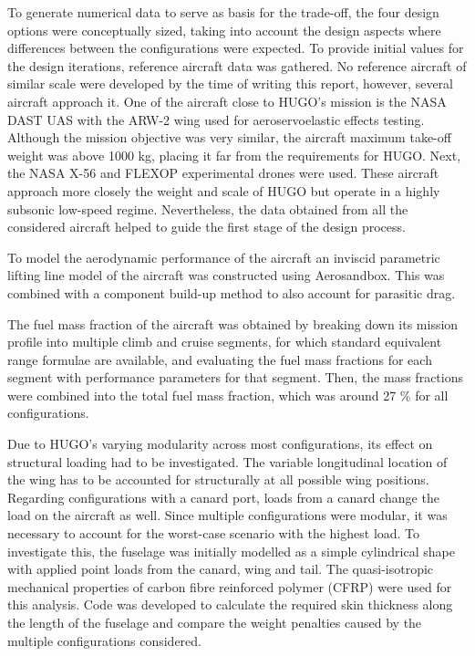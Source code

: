 To generate numerical data to serve as basis for the trade-off, the four design options were conceptually sized, taking into account the design aspects where differences between the configurations were expected. To provide initial values for the design iterations, reference aircraft data was gathered. No reference aircraft of similar scale were developed by the time of writing this report, however, several aircraft approach it. One of the aircraft close to HUGO's mission is the NASA DAST UAS with the ARW-2 wing used for aeroservoelastic effects testing. Although the mission objective was very similar, the aircraft maximum take-off weight was above 1000 kg, placing it far from the requirements for HUGO. Next, the NASA X-56 and FLEXOP experimental drones were used. These aircraft approach more closely the weight and scale of HUGO but operate in a highly subsonic low-speed regime. Nevertheless, the data obtained from all the considered aircraft helped to guide the first stage of the design process.

To model the aerodynamic performance of the aircraft an inviscid parametric lifting line model of the aircraft was constructed using Aerosandbox. This was combined with a component build-up method to also account for parasitic drag.

The fuel mass fraction of the aircraft was obtained by breaking down its mission profile into multiple climb and cruise segments, for which standard equivalent range formulae are available, and evaluating the fuel mass fractions for each segment with performance parameters for that segment. Then, the mass fractions were combined into the total fuel mass fraction, which was around 27 \% for all configurations.

Due to HUGO's varying modularity across most configurations, its effect on structural loading had to be investigated. The variable longitudinal location of the wing has to be accounted for structurally at all possible wing positions. Regarding configurations with a canard port, loads from a canard change the load on the aircraft as well. Since multiple configurations were modular, it was necessary to account for the worst-case scenario with the highest load. To investigate this, the fuselage was initially modelled as a simple cylindrical shape with applied point loads from the canard, wing and tail. The quasi-isotropic mechanical properties of carbon fibre reinforced polymer (CFRP) were used for this analysis. Code was developed to calculate the required skin thickness along the length of the fuselage and compare the weight penalties caused by the multiple configurations considered.

